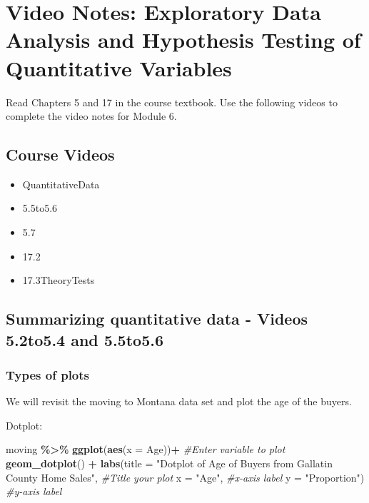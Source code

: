\documentclass[
]{report}
\newenvironment{Shaded}{\begin{snugshade}}{\end{snugshade}}
\newcommand{\AttributeTok}[1]{\textcolor[rgb]{0.13,0.29,0.53}{#1}}
\newcommand{\CommentTok}[1]{\textcolor[rgb]{0.56,0.35,0.01}{\textit{#1}}}
\newcommand{\FunctionTok}[1]{\textcolor[rgb]{0.13,0.29,0.53}{\textbf{#1}}}
\newcommand{\NormalTok}[1]{#1}
\newcommand{\SpecialCharTok}[1]{\textcolor[rgb]{0.81,0.36,0.00}{\textbf{#1}}}
\newcommand{\StringTok}[1]{\textcolor[rgb]{0.31,0.60,0.02}{#1}}
\begin{document}
\newpage

\section{Video Notes: Exploratory Data Analysis and Hypothesis Testing of Quantitative Variables}\label{video-notes-exploratory-data-analysis-and-hypothesis-testing-of-quantitative-variables}

Read Chapters 5 and 17 in the course textbook. Use the following videos to complete the video notes for Module 6.

\subsection{Course Videos}\label{course-videos-4}

\begin{itemize}
\item
  QuantitativeData
\item
  5.5to5.6
\item
  5.7
\item
  17.2
\item
  17.3TheoryTests
\end{itemize}


\subsection*{Summarizing quantitative data - Videos 5.2to5.4 and 5.5to5.6}\label{summarizing-quantitative-data---videos-5.2to5.4-and-5.5to5.6}

\subsubsection*{Types of plots}\label{types-of-plots}

We will revisit the moving to Montana data set and plot the age of the buyers.

Dotplot:

\vspace{0.5in}

\begin{Shaded}
\begin{Highlighting}[]
\NormalTok{moving }\SpecialCharTok{\%\textgreater{}\%}
  \FunctionTok{ggplot}\NormalTok{(}\FunctionTok{aes}\NormalTok{(}\AttributeTok{x =}\NormalTok{ Age))}\SpecialCharTok{+} \CommentTok{\#Enter variable to plot}
  \FunctionTok{geom\_dotplot}\NormalTok{() }\SpecialCharTok{+} 
  \FunctionTok{labs}\NormalTok{(}\AttributeTok{title =} \StringTok{"Dotplot of Age of Buyers from Gallatin }
\StringTok{       County Home Sales"}\NormalTok{, }\CommentTok{\#Title your plot}
       \AttributeTok{x =} \StringTok{"Age"}\NormalTok{, }\CommentTok{\#x{-}axis label}
       \AttributeTok{y =} \StringTok{"Proportion"}\NormalTok{) }\CommentTok{\#y{-}axis label}
\end{Highlighting}
\end{Shaded}
\end{document}
